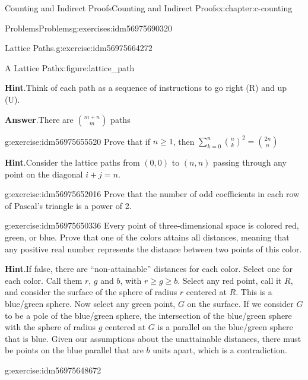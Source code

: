 \documentclass[twoside,10pt,]{book}
\newcommand{\blocktitlefont}{\relax}
\numberwithin{equation}{section}
\begin{document}
\begin{chapterptx}{Counting and Indirect Proofs}{}{Counting and Indirect Proofs}{}{}{x:chapter:c-counting}
\begin{exercises-section}{Problems}{}{Problems}{}{}{g:exercises:idm56975690320}
\begin{divisionexercise}{3}{Lattice Paths.}{}{g:exercise:idm56975664272}
\begin{figureptx}{A Lattice Path}{x:figure:lattice_path}{}
\begin{image}{0.2}{0.6}{0.2}
\end{image}%
\tcblower
\end{figureptx}%
\par\smallskip%
\noindent\textbf{\blocktitlefont Hint}.\hypertarget{g:hint:idm56975659008}{}\quad{}Think of each path as a sequence of instructions to go right (R) and up (U).%
\par\smallskip%
\noindent\textbf{\blocktitlefont Answer}.\hypertarget{g:answer:idm56975658720}{}\quad{}There are \(\binom{m+n}{m}\) paths%
\end{divisionexercise}%
\begin{divisionexercise}{4}{}{}{g:exercise:idm56975655520}%
Prove that if \(n\geq 1\), then \(\sum _{k=0}^n \binom{n}{k}^2=\binom{2 n}{n}\)%
\par\smallskip%
\noindent\textbf{\blocktitlefont Hint}.\hypertarget{g:hint:idm56975653792}{}\quad{}Consider the lattice paths from \((0,0)\) to \((n,n)\) passing through any point on the diagonal \(i + j = n\).%
\end{divisionexercise}%
\begin{divisionexercise}{5}{}{}{g:exercise:idm56975652016}%
Prove that the number of odd coefficients in each row of Pascal's triangle is a power of 2.%
\end{divisionexercise}%
\begin{divisionexercise}{6}{}{}{g:exercise:idm56975650336}%
Every point of three-dimensional space is colored red, green, or blue. Prove that one of the colors attains all distances, meaning that any positive real number represents the distance between two points of this color.%
\par\smallskip%
\noindent\textbf{\blocktitlefont Hint}.\hypertarget{g:hint:idm56975648928}{}\quad{}If false, there are ``non-attainable'' distances for each color. Select one for each color.  Call them \(r\), \(g\) and \(b\), with  \(r \geq g \geq b\).  Select any red point, call it \(R\), and consider the surface of the sphere of radius \(r\) centered at \(R\).   This is a blue\slash{}green sphere.   Now select any green point, \(G\) on the surface. If we consider \(G\) to be a pole of the blue\slash{}green sphere, the intersection of the blue\slash{}green sphere with the sphere of radius \(g\)  centered at \(G\) is a parallel on the blue\slash{}green sphere that is blue.  Given our assumptions about the unattainable distances, there must be points on the blue parallel that are \(b\) units apart, which is a contradiction.%
\end{divisionexercise}%
\begin{divisionexercise}{7}{}{}{g:exercise:idm56975648672}%

\end{divisionexercise}
\end{exercises-section}
\end{chapterptx}
\end{document}

